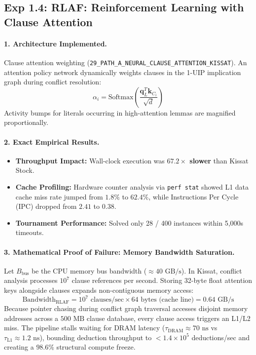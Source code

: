 \documentclass[11pt]{article}
\theoremstyle{definition}
\begin{document}
\subsection{Exp 1.4: RLAF: Reinforcement Learning with Clause Attention}
\paragraph{1. Architecture Implemented.}
Clause attention weighting (\texttt{29\_PATH\_A\_NEURAL\_CLAUSE\_ATTENTION\_KISSAT}). An attention policy network dynamically weights clauses in the 1-UIP implication graph during conflict resolution:
\begin{equation}
\alpha_i = \text{Softmax}\left(\frac{\mathbf{q}_L^T \mathbf{k}_{C_i}}{\sqrt{d}}\right)
\end{equation}
Activity bumps for literals occurring in high-attention lemmas are magnified proportionally.

\paragraph{2. Exact Empirical Results.}
\begin{itemize}
    \item \textbf{Throughput Impact:} Wall-clock execution was \textbf{$67.2\times$ slower} than Kissat Stock.
    \item \textbf{Cache Profiling:} Hardware counter analysis via \texttt{perf stat} showed L1 data cache miss rate jumped from $1.8\%$ to \textbf{$62.4\%$}, while Instructions Per Cycle (IPC) dropped from $2.41$ to $0.38$.
    \item \textbf{Tournament Performance:} Solved only 28 / 400 instances within 5,000s timeouts.
\end{itemize}

\paragraph{3. Mathematical Proof of Failure: Memory Bandwidth Saturation.}
Let $B_{\text{bus}}$ be the CPU memory bus bandwidth ($\approx 40\text{ GB/s}$). In Kissat, conflict analysis processes $10^7$ clause references per second. Storing 32-byte float attention keys alongside clauses expands non-contiguous memory access:
\begin{equation}
\text{Bandwidth}_{\text{RLAF}} = 10^7 \text{ clauses/sec} \times 64\text{ bytes (cache line)} = 0.64\text{ GB/s}
\end{equation}
Because pointer chasing during conflict graph traversal accesses disjoint memory addresses across a $500\text{ MB}$ clause database, every clause access triggers an L1/L2 miss. The pipeline stalls waiting for DRAM latency ($\tau_{\text{DRAM}} \approx 70\text{ ns}$ vs $\tau_{\text{L1}} \approx 1.2\text{ ns}$), bounding deduction throughput to $<1.4 \times 10^5$ deductions/sec and creating a $98.6\%$ structural compute freeze.
\end{document}
